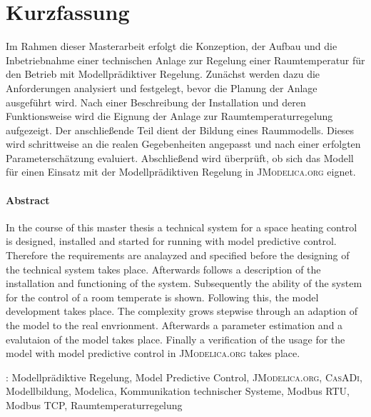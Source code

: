 %
%

\chapter*{Kurzfassung}
\thispagestyle{empty}
Im Rahmen dieser Masterarbeit erfolgt die Konzeption, der Aufbau und die Inbetriebnahme einer technischen Anlage zur Regelung einer Raumtemperatur für den Betrieb mit Modellprädiktiver Regelung. Zunächst werden dazu die Anforderungen analysiert und festgelegt, bevor die Planung der Anlage ausgeführt wird. Nach einer Beschreibung der Installation und deren Funktionsweise wird die Eignung der Anlage zur Raumtemperaturregelung aufgezeigt. Der anschließende Teil dient der Bildung eines Raummodells. Dieses wird schrittweise an die realen Gegebenheiten angepasst und nach einer erfolgten Parameterschätzung evaluiert. Abschließend wird überprüft, ob sich das Modell für einen Einsatz mit der Modellprädiktiven Regelung in \textsc{JModelica.org} eignet.

\subsubsection*{Abstract}
In the course of this master thesis a technical system for a space heating control is designed, installed and started for running with model predictive control. Therefore the requirements are analayzed and specified before the designing of the technical system takes place. Afterwards follows a description of the installation and functioning of the system. Subsequently the ability of the system for the control of a room temperate is shown. Following this, the model development takes place. The complexity grows stepwise through an adaption of the model to the real envrionment. Afterwards a parameter estimation and a evalutaion of the model takes place. Finally a verification of the usage for the model with model predictive control in  \textsc{JModelica.org} takes place.

\vspace{8\baselineskip}

{\normalsize
{}:  Modellprädiktive Regelung, Model Predictive Control, \textsc{JModelica.org}, \textsc{CasADi}, Modellbildung, Modelica, Kommunikation technischer Systeme, Modbus RTU, Modbus TCP, Raumtemperaturregelung
}

